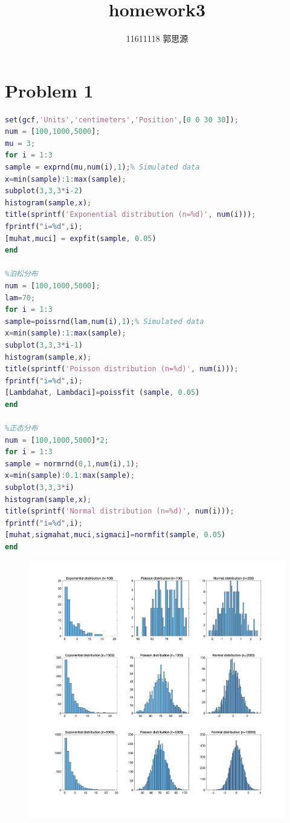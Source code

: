 \documentclass[12pt,a4paper]{article}
\begin{document}
 
\title{homework3}
	\author{11611118 郭思源}  

\section{Problem 1}
\begin{lstlisting}[language=matlab]
%指数分布
set(gcf,'Units','centimeters','Position',[0 0 30 30]);
num = [100,1000,5000];
mu = 3;
for i = 1:3
sample = exprnd(mu,num(i),1);% Simulated data
x=min(sample):1:max(sample);
subplot(3,3,3*i-2)
histogram(sample,x);
title(sprintf('Exponential distribution (n=%d)', num(i)));
fprintf("i=%d",i);
[muhat,muci] = expfit(sample, 0.05)
end

%泊松分布
num = [100,1000,5000];
lam=70;
for i = 1:3
sample=poissrnd(lam,num(i),1);% Simulated data
x=min(sample):1:max(sample);
subplot(3,3,3*i-1)
histogram(sample,x);
title(sprintf('Poisson distribution (n=%d)', num(i)));
fprintf("i=%d",i);
[Lambdahat, Lambdaci]=poissfit (sample, 0.05)
end

%正态分布
num = [100,1000,5000]*2;
for i = 1:3
sample = normrnd(0,1,num(i),1);
x=min(sample):0.1:max(sample);
subplot(3,3,3*i)
histogram(sample,x);
title(sprintf('Normal distribution (n=%d)', num(i)));
fprintf("i=%d",i);
[muhat,sigmahat,muci,sigmaci]=normfit(sample, 0.05)
end
\end{lstlisting}

\begin{figure}[htbp]
\centering
\includegraphics[bb=400 400 1300 1300,scale=.3]{figure/HW3_1.jpg}
\end{figure}
\end{document}
